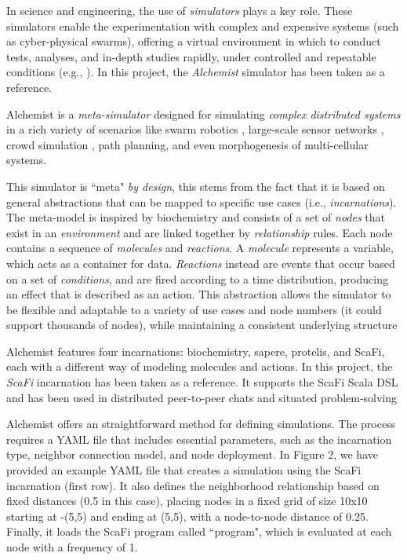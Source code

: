 \documentclass[12pt,a4paper,openright,twoside]{book}
\begin{document}
In science and engineering, the use of \emph{simulators} plays a key role. These simulators enable the experimentation 
    with complex and expensive systems (such as cyber-physical swarms), offering a virtual 
    environment in which to conduct tests, analyses, and in-depth studies rapidly, under controlled and 
    repeatable conditions (e.g., \cite{argun2021simulation, bagrodia1998parsec, choi2021use, cannon2009simulation}).
    In this project, the \emph{Alchemist} \cite{alchemist} simulator has been taken as a reference.

Alchemist is a \emph{meta-simulator} designed for simulating \emph{complex distributed systems} in a rich variety of scenarios 
    like swarm robotics \cite{Casadei2021}, large-scale sensor networks \cite{Aguzzi_2022},
    crowd simulation \cite{Beal2015}, path planning, and even morphogenesis of multi-cellular systems.

This simulator is ``meta" \emph{by design}, this stems from the fact that it is based on general abstractions that
    can be mapped to specific use cases (i.e., \emph{incarnations}). The meta-model is inspired by biochemistry
    and consists of a set of \emph{nodes} that exist in an \emph{environment} and are linked together by 
    \emph{relationship} rules.
    Each node contains a sequence of \emph{molecules} and \emph{reactions}. 
    A \emph{molecule} represents a variable, which acts as a container for data. 
    \emph{Reactions} instead are events that occur based on a set of \emph{conditions}, and are fired according 
    to a time distribution, producing an effect that is described as an action. 
    This abstraction allows the simulator to be flexible and adaptable to a variety of use cases and node
    numbers (it could support thousands of nodes), while maintaining a consistent underlying structure

Alchemist features four incarnations: biochemistry, sapere, protelis, and ScaFi, 
    each with a different way of modeling molecules and actions.
    In this project, the \emph{ScaFi} incarnation has been taken as a reference.
    It supports the ScaFi Scala DSL and has been used in distributed peer-to-peer chats and 
    situated problem-solving

Alchemist offers an straightforward method for defining simulations. The process
    requires a YAML file that includes essential parameters, such as the incarnation
    type, neighbor connection model, and node deployment. In Figure 2, we have
    provided an example YAML file that creates a simulation using the ScaFi incarnation (first row). It also defines the neighborhood relationship based on fixed
    distances (0.5 in this case), placing nodes in a fixed grid of size 10x10 starting
    at -(5,5) and ending at (5,5), with a node-to-node distance of 0.25. Finally, it
    loads the ScaFi program called ``program", which is evaluated at each node with
    a frequency of 1.
\end{document}
